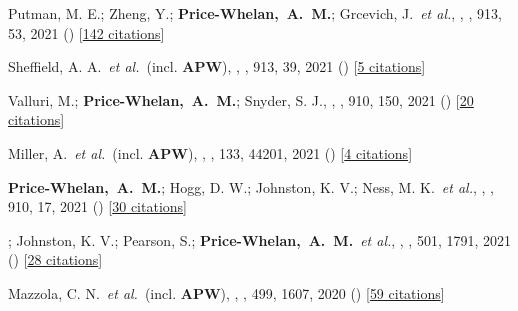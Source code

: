 \item[{\color{deemph}\scriptsize85}]Putman, M. E.; Zheng, Y.; \textbf{Price-Whelan,~A.~M.}; Grcevich, J.~\textit{et al.}, , \apj, 913, 53, 2021 () [\href{http://adsabs.harvard.edu/abs/2021ApJ...913...53P}{142 citations}]

\item[{\color{deemph}\scriptsize84}]Sheffield, A. A.~\textit{et al.}~(incl. \textbf{APW}), , \apj, 913, 39, 2021 () [\href{http://adsabs.harvard.edu/abs/2021ApJ...913...39S}{5 citations}]

\item[{\color{deemph}\scriptsize83}]Valluri, M.; \textbf{Price-Whelan,~A.~M.}; Snyder, S. J., , \apj, 910, 150, 2021 () [\href{http://adsabs.harvard.edu/abs/2021ApJ...910..150V}{20 citations}]

\item[{\color{deemph}\scriptsize82}]Miller, A.~\textit{et al.}~(incl. \textbf{APW}), , \pasp, 133, 44201, 2021 () [\href{http://adsabs.harvard.edu/abs/2021PASP..133d4201M}{4 citations}]

\item[{\color{deemph}\scriptsize81}]\textbf{Price-Whelan,~A.~M.}; Hogg, D. W.; Johnston, K. V.; Ness, M. K.~\textit{et al.}, , \apj, 910, 17, 2021 () [\href{http://adsabs.harvard.edu/abs/2021ApJ...910...17P}{30 citations}]

\item[{\color{deemph}\scriptsize80}]; Johnston, K. V.; Pearson, S.; \textbf{Price-Whelan,~A.~M.}~\textit{et al.}, , \mnras, 501, 1791, 2021 () [\href{http://adsabs.harvard.edu/abs/2021MNRAS.501.1791Y}{28 citations}]

\item[{\color{deemph}\scriptsize79}]Mazzola, C. N.~\textit{et al.}~(incl. \textbf{APW}), , \mnras, 499, 1607, 2020 () [\href{http://adsabs.harvard.edu/abs/2020MNRAS.499.1607M}{59 citations}]

